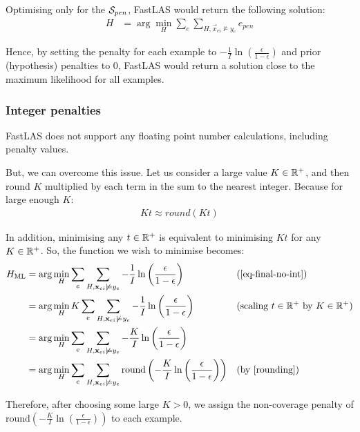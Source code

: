 Optimising only for the $\mathcal{S}_{pen}$, FastLAS would return the following solution:
\begin{align}
H
& = \arg\min_{H}
\sum_e  
\sum_{H,\vec{x}_{ei}\not\models y_e} e_{pen}
\end{align}

Hence, by setting the penalty for each example to $-\frac{1}{I} \ln \left ( \frac{\epsilon}{1 - \epsilon} \right )$ and prior (hypothesis) penalties to 0, FastLAS would return a solution close to the maximum likelihood for all examples.

\subsubsection{Integer penalties}
\label{integer-penalties}

FastLAS does not support any floating point number calculations, including penalty values.

But, we can overcome this issue.
Let us consider a large value $K \in \mathbb{R}^+$, and then round $K$ multiplied by each term in the sum to the nearest integer. Because for large enough $K$:
\begin{align}
    Kt \approx round(Kt) \label{rounding}
\end{align}

In addition, minimising any $t \in \mathbb{R}^+$ is equivalent to minimising $K t$ for any $K \in \mathbb{R}^+$.
So, the function we wish to minimise becomes: 
\begin{align}
H_{\text{ML}}
& = \arg\min_{H}
\sum_e  
\sum_{H,\textbf{x}_{ei}\not\models y_e} -\frac{1}{I}\ln \left ( \frac{\epsilon}{1 - \epsilon} \right ) 
&& \text{(\ref{eq-final-no-int})} \nonumber \\
& = \arg\min_{H}
K \sum_e  
\sum_{H,\textbf{x}_{ei}\not\models y_e} -\frac{1}{I}\ln \left ( \frac{\epsilon}{1 - \epsilon} \right ) 
&& \text{(scaling $t \in \mathbb{R}^+$ by $K \in \mathbb{R}^+$)} \nonumber \\
& = \arg\min_{H}
\sum_e  
\sum_{H,\textbf{x}_{ei}\not\models y_e} -\frac{K}{I}\ln \left ( \frac{\epsilon}{1 - \epsilon} \right ) \nonumber \\ 
& = \arg\min_{H}
\sum_e  
\sum_{H,\textbf{x}_{ei}\not\models y_e} \text{round} \left ( -\frac{K}{I}\ln \left ( \frac{\epsilon}{1 - \epsilon} \right ) \right )
&& \text{(by \ref{rounding})}
\end{align}

Therefore, after choosing some large $K > 0$, we assign the non-coverage penalty of $\text{round} \left ( -\frac{K}{I} \ln \left ( \frac{\epsilon}{1 - \epsilon} \right ) \right )$ to each example.


